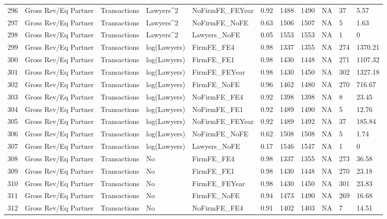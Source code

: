 \begin{table}[ht]
\begin{tabular}{rllllllllll}
  296 & Gross Rev/Eq Partner & Transactions & Lawyers^2 & NoFirmFE\_FEYear & 0.92 & 1488 & 1490 & NA & 37 & 5.57 \\ 
  297 & Gross Rev/Eq Partner & Transactions & Lawyers^2 & NoFirmFE\_NoFE & 0.63 & 1506 & 1507 & NA & 5 & 1.63 \\ 
  298 & Gross Rev/Eq Partner & Transactions & Lawyers^2 & Lawyers\_NoFE & 0.05 & 1553 & 1553 & NA & 1 & 0 \\ 
  299 & Gross Rev/Eq Partner & Transactions & log(Lawyers) & FirmFE\_FE4 & 0.98 & 1337 & 1355 & NA & 274 & 1370.21 \\ 
  300 & Gross Rev/Eq Partner & Transactions & log(Lawyers) & FirmFE\_FE1 & 0.98 & 1430 & 1448 & NA & 271 & 1107.32 \\ 
  301 & Gross Rev/Eq Partner & Transactions & log(Lawyers) & FirmFE\_FEYear & 0.98 & 1430 & 1450 & NA & 302 & 1327.18 \\ 
  302 & Gross Rev/Eq Partner & Transactions & log(Lawyers) & FirmFE\_NoFE & 0.96 & 1462 & 1480 & NA & 270 & 716.67 \\ 
  303 & Gross Rev/Eq Partner & Transactions & log(Lawyers) & NoFirmFE\_FE4 & 0.92 & 1398 & 1398 & NA & 8 & 23.45 \\ 
  304 & Gross Rev/Eq Partner & Transactions & log(Lawyers) & NoFirmFE\_FE1 & 0.92 & 1489 & 1490 & NA & 5 & 12.76 \\ 
  305 & Gross Rev/Eq Partner & Transactions & log(Lawyers) & NoFirmFE\_FEYear & 0.92 & 1489 & 1492 & NA & 37 & 185.84 \\ 
  306 & Gross Rev/Eq Partner & Transactions & log(Lawyers) & NoFirmFE\_NoFE & 0.62 & 1508 & 1508 & NA & 5 & 1.74 \\ 
  307 & Gross Rev/Eq Partner & Transactions & log(Lawyers) & Lawyers\_NoFE & 0.17 & 1546 & 1547 & NA & 1 & 0 \\ 
  308 & Gross Rev/Eq Partner & Transactions & No & FirmFE\_FE4 & 0.98 & 1337 & 1355 & NA & 273 & 36.58 \\ 
  309 & Gross Rev/Eq Partner & Transactions & No & FirmFE\_FE1 & 0.98 & 1430 & 1448 & NA & 270 & 23.18 \\ 
  310 & Gross Rev/Eq Partner & Transactions & No & FirmFE\_FEYear & 0.98 & 1430 & 1450 & NA & 301 & 23.83 \\ 
  311 & Gross Rev/Eq Partner & Transactions & No & FirmFE\_NoFE & 0.94 & 1473 & 1490 & NA & 269 & 16.68 \\ 
  312 & Gross Rev/Eq Partner & Transactions & No & NoFirmFE\_FE4 & 0.91 & 1402 & 1403 & NA & 7 & 14.51 \\ 

\end{tabular}
\end{table}
